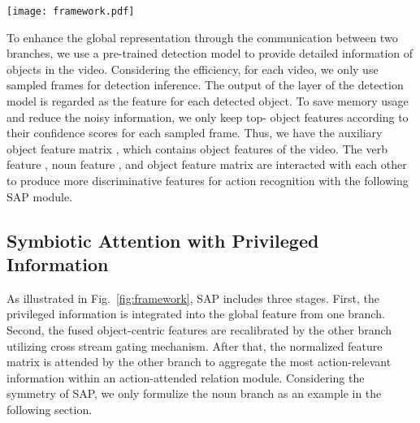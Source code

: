 \documentclass[letterpaper]{article} \usepackage{aaai20}  \usepackage{times}  \usepackage{helvet} \usepackage{courier}  \usepackage[hyphens]{url}  \usepackage{graphicx} \urlstyle{rm} \def\UrlFont{\rm}  \usepackage{graphicx}  \frenchspacing  \setlength{\pdfpagewidth}{8.5in}  \setlength{\pdfpageheight}{11in}  \usepackage{amsfonts,amssymb}
\begin{document}
\begin{figure*}[t]
\center
\texttt{[image: framework.pdf]}
\caption{
The proposed method. Our framework consists of three feature extractors and one interaction module SAP. 
VerbNet and NounNet produce global features. Detection Model generates a set of local object features as privileged information. 
The privileged information is integrated into the global features to obtain object-centric feature matrices. These feature matrices are normalized by a cross stream gating mechanism. After that, the object-centric matrices are attended by the other branch to select the most action-relevant information. The outputs of SAP are used to classify the verb and noun, respectively.
}
\label{fig:framework}  
\end{figure*}
To enhance the global representation through the communication between two branches, we use a pre-trained detection model to provide detailed information of objects in the video.
Considering the efficiency, for each video, we only use  sampled frames for detection inference.
The output of the  layer of the detection model is regarded as the feature for each detected object.
To save memory usage and reduce the noisy information, we only keep top- object features according to their confidence scores for each sampled frame.
Thus, we have the auxiliary object feature matrix , which contains  object features of the video. The verb feature , noun feature , and object feature matrix  are interacted with each other to produce more discriminative features for action recognition with the following SAP module.

\subsection{Symbiotic Attention with Privileged Information}
As illustrated in Fig.~\ref{fig:framework}, SAP includes three stages. First, the privileged information is integrated into the global feature from one branch. Second, the fused object-centric features are recalibrated by the other branch utilizing cross stream gating mechanism. After that, the normalized feature matrix is attended by the other branch to aggregate the most action-relevant information within an action-attended relation module. Considering the symmetry of SAP, we only formulize the noun branch as an example in the following section. 
\end{document}
